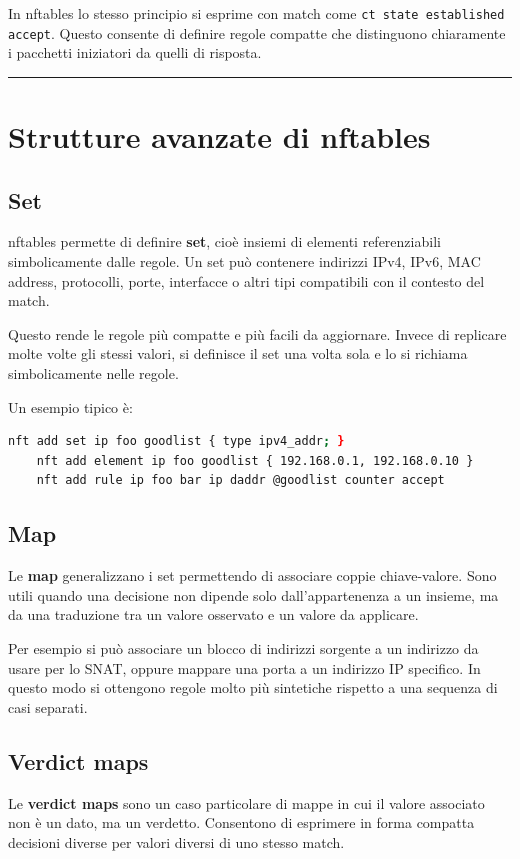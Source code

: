 \documentclass[12pt, a4paper]{report}
\begin{document}
In nftables lo stesso principio si esprime con match come \texttt{ct state established accept}. Questo consente di definire regole compatte che distinguono chiaramente i pacchetti iniziatori da quelli di risposta.

\noindent\rule{\textwidth}{0.4pt}

\section{Strutture avanzate di nftables}

\subsection{Set}
nftables permette di definire \textbf{set}, cioè insiemi di elementi referenziabili simbolicamente dalle regole. Un set può contenere indirizzi IPv4, IPv6, MAC address, protocolli, porte, interfacce o altri tipi compatibili con il contesto del match.

Questo rende le regole più compatte e più facili da aggiornare. Invece di replicare molte volte gli stessi valori, si definisce il set una volta sola e lo si richiama simbolicamente nelle regole.

Un esempio tipico è:
\begin{lstlisting}[language=bash]
	nft add set ip foo goodlist { type ipv4_addr; }
	nft add element ip foo goodlist { 192.168.0.1, 192.168.0.10 }
	nft add rule ip foo bar ip daddr @goodlist counter accept
\end{lstlisting}

\subsection{Map}
Le \textbf{map} generalizzano i set permettendo di associare coppie chiave-valore. Sono utili quando una decisione non dipende solo dall'appartenenza a un insieme, ma da una traduzione tra un valore osservato e un valore da applicare.

Per esempio si può associare un blocco di indirizzi sorgente a un indirizzo da usare per lo SNAT, oppure mappare una porta a un indirizzo IP specifico. In questo modo si ottengono regole molto più sintetiche rispetto a una sequenza di casi separati.

\subsection{Verdict maps}
Le \textbf{verdict maps} sono un caso particolare di mappe in cui il valore associato non è un dato, ma un verdetto. Consentono di esprimere in forma compatta decisioni diverse per valori diversi di uno stesso match.
\end{document}
